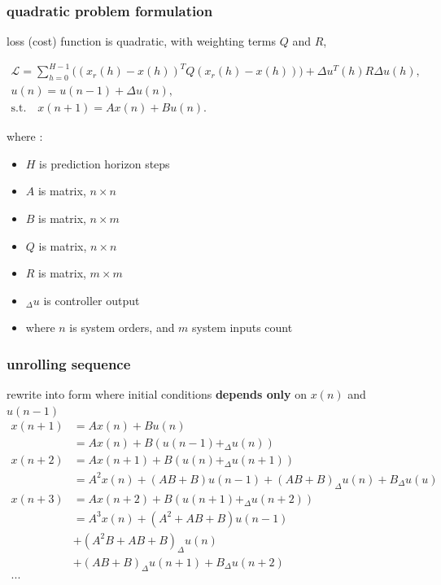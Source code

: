 \documentclass{beamer}
\begin{document}
\begin{frame}
  
  \frametitle{\bf quadratic problem formulation}

  loss (cost) function is quadratic, with weighting terms $Q$ and $R$,

  \begin{align*}
    \mathcal{L} = \sum_{h=0}^{H-1} \big((x_r(h) - x(h))^T Q (x_r(h) - x(h))\big) + \Delta u^T(h) R \Delta u(h), \\
    u(n) = u(n-1) + \Delta u(n), \\
    \text{s.t.} \quad x(n+1) = Ax(n) + Bu(n).
  \end{align*}

  where : 
  \begin{itemize}
    \item $H$ is prediction horizon steps
    \item $A$ is matrix, $n \times n$
    \item $B$ is matrix, $n \times m$
    \item $Q$ is matrix, $n \times n$
    \item $R$ is matrix, $m \times m$
    \item $_\Delta u$ is controller output
    \item where $n$ is system orders, and $m$ system inputs count
  \end{itemize}

  
\end{frame}


\begin{frame}
  
  \frametitle{\bf unrolling sequence}
  rewrite into form where initial conditions {\bf depends only} on $x(n)$ and $u(n-1)$ 
  \begin{align*}
    x(n+1)&= Ax(n) + Bu(n) \\
          &= Ax(n) + B(u(n-1) + _\Delta u(n)) \\
    x(n+2)&= Ax(n+1) + B(u(n) + _\Delta u(n+1)) \\
          &= A^2x(n) + (AB + B)u(n-1) + (AB+B)_\Delta u(n) + B_\Delta u(u) \\
    x(n+3)&= Ax(n+2) + B(u(n+1) + _\Delta u(n+2)) \\
          &= A^3x(n) + (A^2 + AB + B)u(n-1) \\
          & + (A^2B + AB + B)_\Delta u(n) \\
          & + (AB + B)_\Delta u(n+1) + B_\Delta u(n+2) \\
    ... 
  \end{align*}  

  
\end{frame}
\end{document}
